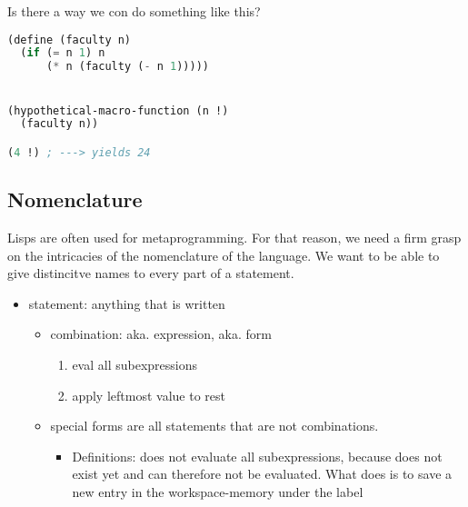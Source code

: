 Is there a way we con do something like this?
\begin{lstlisting}[language=lisp]
(define (faculty n)
  (if (= n 1) n
      (* n (faculty (- n 1)))))


(hypothetical-macro-function (n !)
  (faculty n))

(4 !) ; ---> yields 24
\end{lstlisting}



\subsection{Nomenclature}

Lisps are often used for metaprogramming. For that reason, we need a firm grasp on the intricacies of the nomenclature of the language. We want to be able to give distincitve names to every part of a statement. 

\begin{itemize}
  \item statement: anything that is written 
  \begin{itemize}
    \item combination: aka. expression, aka. form 
    \begin{enumerate}
      \item eval all subexpressions
      \item apply leftmost value to rest
    \end{enumerate}
  \item special forms are all statements that are not combinations. 
  \begin{itemize}
    \item Definitions:  does not evaluate all subexpressions, because  does not exist yet and can therefore not be evaluated. What  does is to save a new entry in the workspace-memory under the label 
  \end{itemize}
  \end{itemize}
\end{itemize}
